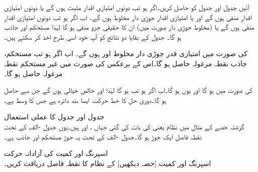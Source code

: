 آئیں جدول  اور جدول  کو حاصل کریں۔اگر  ہو تب دونوں امتیازی اقدار مثبت ہوں گے یا دونوں امتیازی اقدار منفی ہوں گے اور یا امتیازی اقدار جوڑی دار مخلوط ہوں گے۔ اب اگر  ہو تب دونوں امتیازی اقدار  منفی ہوں گے یا (مخلوط جوڑی دار صورت میں) ان کا حقیقی جزو منفی ہو گا لہٰذا  مستحکم اور جاذب ہو گا۔ جدول  کے بقایا دو نتائج کو آپ خود اسی طرح اخذ کر سکتے ہیں۔

  کی صورت میں امتیازی قدر جوڑی دار مخلوط  اور  ہوں گے۔ اب اگر  ہو تب مستحکم، جاذب نقطہ مرغولہ حاصل ہو گا۔اس کے برعکس  کی صورت میں غیر مستحکم نقطہ مرغولہ حاصل ہو گا۔

 کی صورت میں  ہو گا اور یوں  ہو گا۔اب اگر  ہو تب   ہو گا لہٰذا  اور  خالص خیالی ہوں گے جن سے   حاصل ہو گا۔دوری حل کا خط حرکت ایسا بند دائرہ ہے جس کا وسط  ہے۔

\quad جدول  اور جدول  کا عملی استعمال\\
گزشتہ حصے کے مثال  میں نظام  یعنی 
  کی بات کی گئی جہاں ،  اور  ہیں۔یوں جدول -الف کے تحت نقطہ فاصل ایک جوڑ ہو گا۔جدول -الف کے تحت یہ جوڑ مستحکم اور جاذب ہے۔

\quad اسپرنگ اور کمیت کی آزادانہ حرکت\\
اسپرنگ اور کمیت [حصہ  دیکھیں] کے نظام  کا نقطہ فاصل دریافت کریں۔

